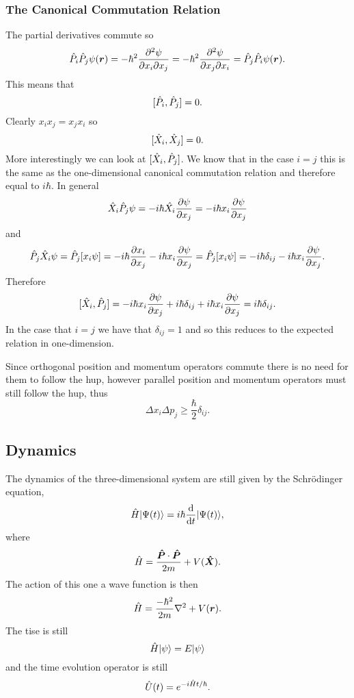     \subsubsection{The Canonical Commutation Relation}
    The partial derivatives commute so
    \[\hat{P}_i\hat{P}_j\psi(\bm{r}) = -\hbar^2\frac{\partial^2{\psi}}{\partial{x_i}\partial{x_j}} = -\hbar^2\frac{\partial^2{\psi}}{\partial{x_j}\partial{x_i}} = \hat{P}_j\hat{P}_i\psi(\bm{r}).\]
    This means that
    \[[\hat{P}_i, \hat{P}_j] = 0.\]
    Clearly \(x_ix_j = x_jx_i\) so
    \[[\hat{X}_i, \hat{X}_j] = 0.\]
    More interestingly we can look at \([\hat{X}_i, \hat{P}_j]\).
    We know that in the case \(i = j\) this is the same as the one-dimensional canonical commutation relation and therefore equal to \(i\hbar\).
    In general
    \[\hat{X}_i\hat{P}_j\psi = -i\hbar\hat{X_i}\pdv{\psi}{x_j} = -i\hbar x_i\pdv{\psi}{x_j}\]
    and
    \[\hat{P}_j\hat{X}_i\psi = \hat{P}_j[x_i\psi] = -i\hbar\pdv{x_i}{x_j} - i\hbar x_i\pdv{\psi}{x_j} = \hat{P}_j[x_i\psi] = -i\hbar\delta_{ij} - i\hbar x_i\pdv{\psi}{x_j}.\]
    Therefore
    \[[\hat{X}_i, \hat{P}_j] = -i\hbar x_i\pdv{\psi}{x_j} + i\hbar\delta_{ij} + i\hbar x_i\pdv{\psi}{x_j} = i\hbar\delta_{ij}.\]
    In the case that \(i = j\) we have that \(\delta_{ij} = 1\) and so this reduces to the expected relation in one-dimension.
    
    Since orthogonal position and momentum operators commute there is no need for them to follow the \gls{hup}, however parallel position and momentum operators must still follow the \gls{hup}, thus
    \[\Delta x_i\Delta p_j \ge \frac{\hbar}{2}\delta_{ij}.\]
    
    \subsection{Dynamics}
    The dynamics of the three-dimensional system are still given by the Schr\"odinger equation,
    \[\hat{H}\vert {\Psi(t)} \rangle = i\hbar\dv{t}\vert {\Psi(t)} \rangle,\]
    where
    \[\hat{H} = \frac{\bm{\hat{P}}\cdot\bm{\hat{P}}}{2m} + V(\bm{\hat{X}}).\]
    The action of this one a wave function is then
    \[\hat{H} = \frac{-\hbar^2}{2m}\nabla^2 + V(\bm{r}).\]
    The \gls{tise} is still
    \[\hat{H}\vert {\psi} \rangle = E\vert {\psi} \rangle\]
    and the time evolution operator is still
    \[\hat{U}(t) = e^{-i\hat{H}t/\hbar}.\]
    
